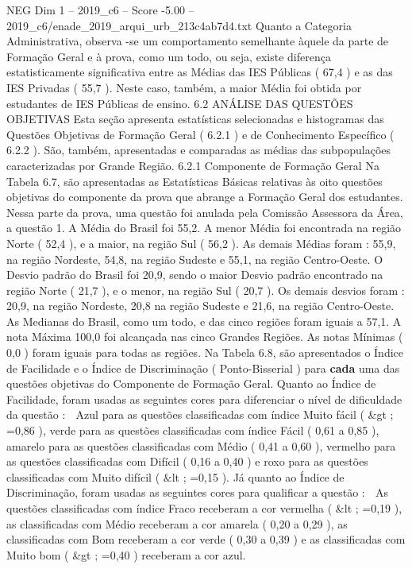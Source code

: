 \begin{textsample}{NEG Dim 1 – 2019\_c6 – Score -5.00 – 2019\_c6/enade\_2019\_arqui\_urb\_213c4ab7d4.txt}
Quanto a Categoria Administrativa, observa -se um comportamento semelhante àquele da parte de Formação Geral e à prova, como um todo, ou seja, existe diferença estatisticamente significativa entre as Médias das IES Públicas ( 67,4 ) e as das IES Privadas ( 55,7 ).
Neste caso, também, a maior Média foi obtida por estudantes de IES Públicas de ensino. 6.2 ANÁLISE DAS QUESTÕES OBJETIVAS Esta seção apresenta estatísticas selecionadas e histogramas das Questões Objetivas de Formação Geral ( 6.2.1 ) e de Conhecimento Específico ( 6.2.2 ).
São, também, apresentadas e comparadas as médias das subpopulações caracterizadas por Grande Região. 6.2.1 Componente de Formação Geral Na Tabela 6.7, são apresentadas as Estatísticas Básicas relativas às oito questões objetivas do componente da prova que abrange a Formação Geral dos estudantes.
Nessa parte da prova, uma questão foi anulada pela Comissão Assessora da Área, a questão 1.
A Média do Brasil foi 55,2.
A menor Média foi encontrada na região Norte ( 52,4 ), e a maior, na região Sul ( 56,2 ).
As demais Médias foram : 55,9, na região Nordeste, 54,8, na região Sudeste e 55,1, na região Centro-Oeste.
O Desvio padrão do Brasil foi 20,9, sendo o maior Desvio padrão encontrado na região Norte ( 21,7 ), e o menor, na região Sul ( 20,7 ).
Os demais desvios foram : 20,9, na região Nordeste, 20,8 na região Sudeste e 21,6, na região Centro-Oeste.
As Medianas do Brasil, como um todo, e das cinco regiões foram iguais a 57,1.
A nota Máxima 100,0 foi alcançada nas cinco Grandes Regiões.
As notas Mínimas ( 0,0 ) foram iguais para todas as regiões.
Na Tabela 6.8, são apresentados o Índice de Facilidade e o Índice de Discriminação ( Ponto-Bisserial ) para \textbf{cada} uma das questões objetivas do Componente de Formação Geral.
Quanto ao Índice de Facilidade, foram usadas as seguintes cores para diferenciar o nível de dificuldade da questão :  Azul para as questões classificadas com índice Muito fácil ( \&gt ; =0,86 ), verde para as questões classificadas com índice Fácil ( 0,61 a 0,85 ), amarelo para as questões classificadas com Médio ( 0,41 a 0,60 ), vermelho para as questões classificadas com Difícil ( 0,16 a 0,40 ) e roxo para as questões classificadas com Muito difícil ( \&lt ; =0,15 ).
Já quanto ao Índice de Discriminação, foram usadas as seguintes cores para qualificar a questão :  As questões classificadas com índice Fraco receberam a cor vermelha ( \&lt ; =0,19 ), as classificadas com Médio receberam a cor amarela ( 0,20 a 0,29 ), as classificadas com Bom receberam a cor verde ( 0,30 a 0,39 ) e as classificadas com Muito bom ( \&gt ; =0,40 ) receberam a cor azul.

\end{textsample}
